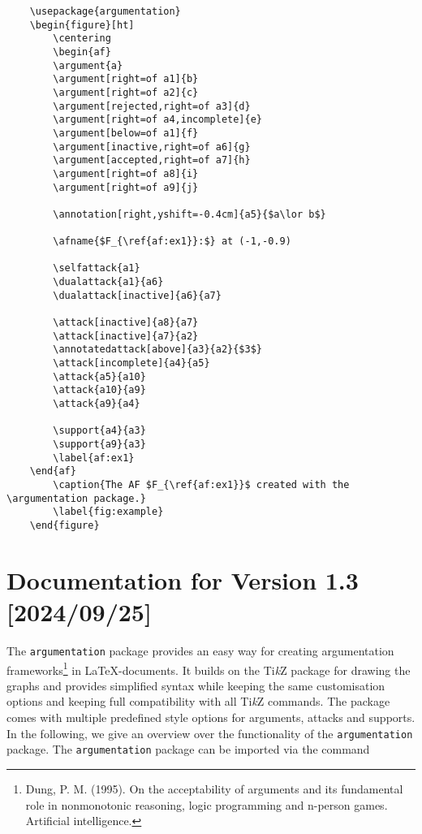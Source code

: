 \documentclass[headings=normal]{scrartcl}
\newcommand{\tikzname}{Ti\emph{k}Z\xspace}
\newcommand{\argumentation}{\texttt{argumentation}\xspace}
\begin{document}
\hspace{-1.2cm}
\begin{minipage}[c]{0.99\textwidth}
\begin{verbatim}
    \usepackage{argumentation}
    \begin{figure}[ht]
        \centering
        \begin{af}
        \argument{a}
        \argument[right=of a1]{b}
        \argument[right=of a2]{c}
        \argument[rejected,right=of a3]{d}
        \argument[right=of a4,incomplete]{e}
        \argument[below=of a1]{f}
        \argument[inactive,right=of a6]{g}
        \argument[accepted,right=of a7]{h}
        \argument[right=of a8]{i}
        \argument[right=of a9]{j}

        \annotation[right,yshift=-0.4cm]{a5}{$a\lor b$}

        \afname{$F_{\ref{af:ex1}}:$} at (-1,-0.9)

        \selfattack{a1}
        \dualattack{a1}{a6}
        \dualattack[inactive]{a6}{a7}
        
        \attack[inactive]{a8}{a7}
        \attack[inactive]{a7}{a2}
        \annotatedattack[above]{a3}{a2}{$3$}
        \attack[incomplete]{a4}{a5}
        \attack{a5}{a10}
        \attack{a10}{a9}
        \attack{a9}{a4}

        \support{a4}{a3}
        \support{a9}{a3}
        \label{af:ex1}
    \end{af}
        \caption{The AF $F_{\ref{af:ex1}}$ created with the \argumentation package.}
        \label{fig:example}
    \end{figure}
\end{verbatim}
\end{minipage}

\newpage\section{Documentation for Version 1.3 [2024/09/25]}\label{sec:documentation}

The \argumentation package provides an easy way for creating argumentation frameworks\footnote{Dung, P. M. (1995). On the acceptability of arguments and its fundamental role in nonmonotonic reasoning, logic programming and n-person games. Artificial intelligence.} in \LaTeX-documents.
It builds on the \tikzname package for drawing the graphs and provides simplified syntax while keeping the same customisation options and keeping full compatibility with all \tikzname commands.
The package comes with multiple predefined style options for arguments, attacks and supports.
In the following, we give an overview over the functionality of the \argumentation package.
The \argumentation package can be imported via the command
    
\end{document}
